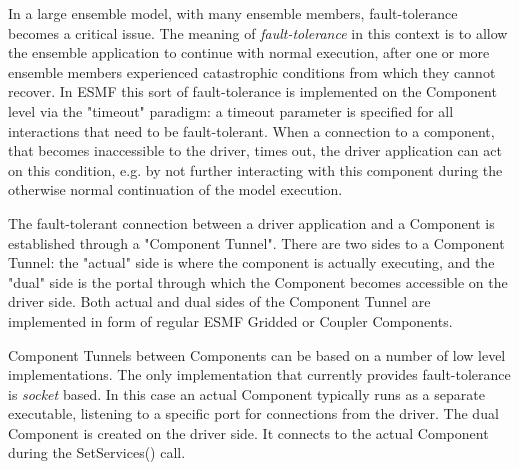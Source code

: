 %

\label{sec:CompTunnel}

In a large ensemble model, with many ensemble members, fault-tolerance becomes a critical issue. The meaning of {\em fault-tolerance} in this context is to allow the ensemble application to continue with normal execution, after one or more ensemble members experienced catastrophic conditions from which they cannot recover. In ESMF this sort of fault-tolerance is implemented on the Component level via the "timeout" paradigm: a timeout parameter is specified for all interactions that need to be fault-tolerant. When a connection to a component, that becomes inaccessible to the driver, times out, the driver application can act on this condition, e.g. by not further interacting with this component during the otherwise normal continuation of the model execution.

The fault-tolerant connection between a driver application and a Component is established through a "Component Tunnel". There are two sides to a Component Tunnel: the "actual" side is where the component is actually executing, and the "dual" side is the portal through which the Component becomes accessible on the driver side. Both actual and dual sides of the Component Tunnel are implemented in form of regular ESMF Gridded or Coupler Components.

Component Tunnels between Components can be based on a number of low level implementations. The only implementation that currently provides fault-tolerance is {\em socket} based. In this case an actual Component typically runs as a separate executable, listening to a specific port for connections from the driver. The dual Component is created on the driver side. It connects to the actual Component during the SetServices() call.

